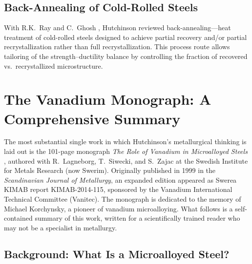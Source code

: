 \documentclass[11pt,a4paper]{article}
\begin{document}
\subsection{Back-Annealing of Cold-Rolled Steels}

With R.K.~Ray and C.~Ghosh \cite{Ray2011}, Hutchinson reviewed
back-annealing---heat treatment of cold-rolled steels designed to
achieve partial recovery and/or partial recrystallization rather than
full recrystallization.  This process route allows tailoring of the
strength--ductility balance by controlling the fraction of recovered vs.\
recrystallized microstructure.

\section{The Vanadium Monograph: A Comprehensive Summary}
\label{sec:vanadium-monograph}

The most substantial single work in which Hutchinson's metallurgical
thinking is laid out is the 101-page monograph \emph{The Role of Vanadium
in Microalloyed Steels} \cite{Lagneborg2014}, authored with R.~Lagneborg,
T.~Siwecki, and S.~Zajac at the Swedish Institute for Metals Research
(now Swerim).  Originally published in 1999 in the \emph{Scandinavian
Journal of Metallurgy}, an expanded edition appeared as Swerea KIMAB
report KIMAB-2014-115, sponsored by the Vanadium International Technical
Committee (Vanitec).  The monograph is dedicated to the memory of Michael
Korchynsky, a pioneer of vanadium microalloying.  What follows is a
self-contained summary of this work, written for a scientifically trained
reader who may not be a specialist in metallurgy.

\subsection{Background: What Is a Microalloyed Steel?}
\end{document}
